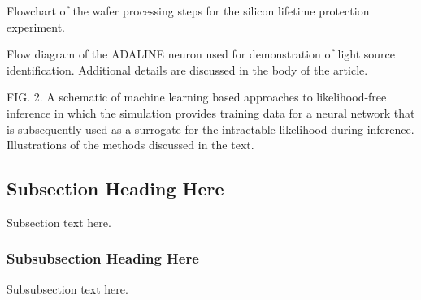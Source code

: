 \documentclass[journal]{IEEEtran}
\begin{document}
Flowchart of the wafer processing steps for the silicon lifetime protection experiment.

Flow diagram
of the ADALINE neuron used for demonstration of light source identiﬁcation. Additional details are discussed in the body of the article.

FIG. 2. A schematic of machine learning based approaches to likelihood-free inference in which the simulation provides training data
for a neural network that is subsequently used as a surrogate for the intractable likelihood during inference.
Illustrations of the methods discussed in the text.

%



\subsection{Subsection Heading Here}
Subsection text here.


\subsubsection{Subsubsection Heading Here}
Subsubsection text here.
\end{document}

